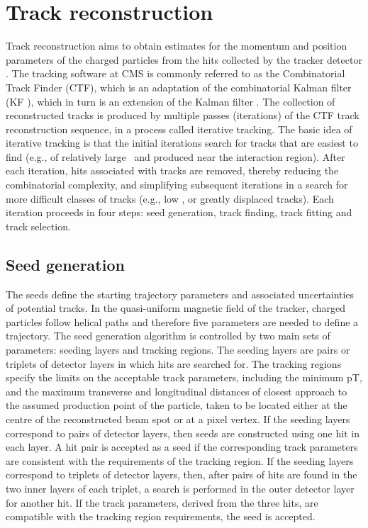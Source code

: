 \section{Track reconstruction}
Track reconstruction aims to obtain estimates for the momentum and position parameters of the charged particles from the hits collected by the tracker detector \cite{Track}. The tracking software at CMS is commonly referred to as the Combinatorial Track Finder (CTF), which is an adaptation of the combinatorial Kalman filter (KF \cite{KF_1, KF_2}), which in turn is an extension of the Kalman filter \cite{KF_1}. The collection of reconstructed tracks is produced by multiple passes (iterations) of the CTF track reconstruction sequence, in a process called iterative tracking. The basic idea of iterative tracking is that the initial iterations search for tracks that are easiest to find (e.g., of relatively large \pt\, and produced near the interaction region). After each iteration, hits associated with tracks are removed, thereby reducing the combinatorial complexity, and simplifying subsequent iterations in a search for more difficult classes of tracks (e.g., low \pt, or greatly displaced tracks). Each iteration proceeds in four steps: seed generation, track finding, track fitting and track selection.
\subsection{Seed generation}
The seeds define the starting trajectory parameters and associated uncertainties of potential tracks. In the quasi-uniform magnetic field of the tracker, charged particles follow helical paths and therefore five parameters are needed to define a trajectory. The seed generation algorithm is controlled by two main sets of parameters: seeding layers and tracking regions. The seeding layers are pairs or triplets of detector layers in which hits are searched for. The tracking regions specify the limits on the acceptable track parameters, including the minimum pT, and the maximum transverse and longitudinal distances of closest approach to the assumed production point of the particle, taken to be located either at the centre of the reconstructed beam spot or at a pixel vertex. If the seeding layers correspond to pairs of detector layers, then seeds are constructed using one hit in each layer. A hit pair is accepted as a seed if the corresponding track parameters are consistent with the requirements of the tracking region. If the seeding layers correspond to triplets of detector layers, then, after pairs of hits are found in the two inner layers of each triplet, a search is performed in the outer detector layer for another hit. If the track parameters, derived from the three hits, are compatible with the tracking region requirements, the seed is accepted.
